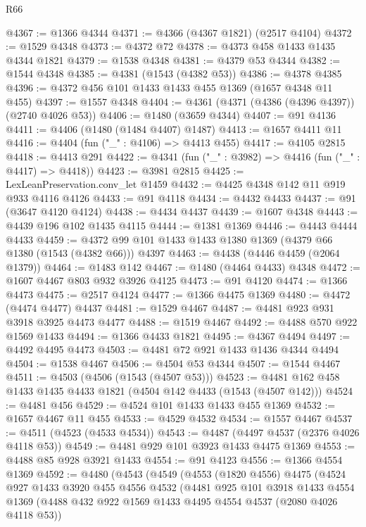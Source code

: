 \begin{lexlean}{R66}
\begin{coremodule}
@4367 := @1366 @4344
@4371 := @4366 (@4367 @1821) (@2517 @4104)
@4372 := @1529 @4348
@4373 := @4372 @72
@4378 := @4373 @458 @1433 @1435 @4344 @1821
@4379 := @1538 @4348
@4381 := @4379 @53 @4344
@4382 := @1544 @4348
@4385 := @4381 (@1543 (@4382 @53))
@4386 := @4378 @4385
@4396 := @4372 @456 @101 @1433 @1433 @455 @1369 (@1657 @4348 @11 @455)
@4397 := @1557 @4348
@4404 := @4361 (@4371 (@4386 (@4396 @4397)) (@2740 @4026 @53))
@4406 := @1480 (@3659 @4344)
@4407 := @91 @4136
@4411 := @4406 (@1480 (@1484 @4407) @1487)
@4413 := @1657 @4411 @11
@4416 := @4404 (fun ("_" : @4106) => @4413 @455)
@4417 := @4105 @2815
@4418 := @4413 @291
@4422 := @4341 (fun ("_" : @3982) => @4416 (fun ("_" : @4417) => @4418))
@4423 := @3981 @2815
@4425 := LexLeanPreservation.conv_let @1459
@4432 := @4425 @4348 @142 @11 @919 @933 @4116 @4126
@4433 := @91 @4118
@4434 := @4432 @4433
@4437 := @91 (@3647 @4120 @4124)
@4438 := @4434 @4437
@4439 := @1607 @4348
@4443 := @4439 @196 @102 @1435 @4115
@4444 := @1381 @1369
@4446 := @4443 @4444 @4433
@4459 := @4372 @99 @101 @1433 @1433 @1380 @1369 (@4379 @66 @1380 (@1543 (@4382 @66))) @4397
@4463 := @4438 (@4446 @4459 (@2064 @1379))
@4464 := @1483 @142
@4467 := @1480 (@4464 @4433) @4348
@4472 := @1607 @4467 @803 @932 @3926 @4125
@4473 := @91 @4120
@4474 := @1366 @4473
@4475 := @2517 @4124
@4477 := @1366 @4475 @1369
@4480 := @4472 (@4474 @4477) @4437
@4481 := @1529 @4467
@4487 := @4481 @923 @931 @3918 @3925 @4473 @4477
@4488 := @1519 @4467
@4492 := @4488 @570 @922 @1569 @1433
@4494 := @1366 @4433 @1821
@4495 := @4367 @4494
@4497 := @4492 @4495 @4473
@4503 := @4481 @72 @921 @1433 @1436 @4344 @4494
@4504 := @1538 @4467
@4506 := @4504 @53 @4344
@4507 := @1544 @4467
@4511 := @4503 (@4506 (@1543 (@4507 @53)))
@4523 := @4481 @162 @458 @1433 @1435 @4433 @1821 (@4504 @142 @4433 (@1543 (@4507 @142)))
@4524 := @4481 @456
@4529 := @4524 @101 @1433 @1433 @455 @1369
@4532 := @1657 @4467 @11 @455
@4533 := @4529 @4532
@4534 := @1557 @4467
@4537 := @4511 (@4523 (@4533 @4534))
@4543 := @4487 (@4497 @4537 (@2376 @4026 @4118 @53))
@4549 := @4481 @929 @101 @3923 @1433 @4475 @1369
@4553 := @4488 @85 @928 @3921 @1433
@4554 := @91 @4123
@4556 := @1366 @4554 @1369
@4592 := @4480
    (@4543
      (@4549
        (@4553
          (@1820 @4556)
          @4475
          (@4524
            @927
            @1433
            @3920
            @455
            @4556
            @4532
            (@4481
              @925
              @101
              @3918
              @1433
              @4554
              @1369
              (@4488 @432 @922 @1569 @1433 @4495 @4554 @4537 (@2080 @4026 @4118 @53))

\end{coremodule}
\end{lexlean}
